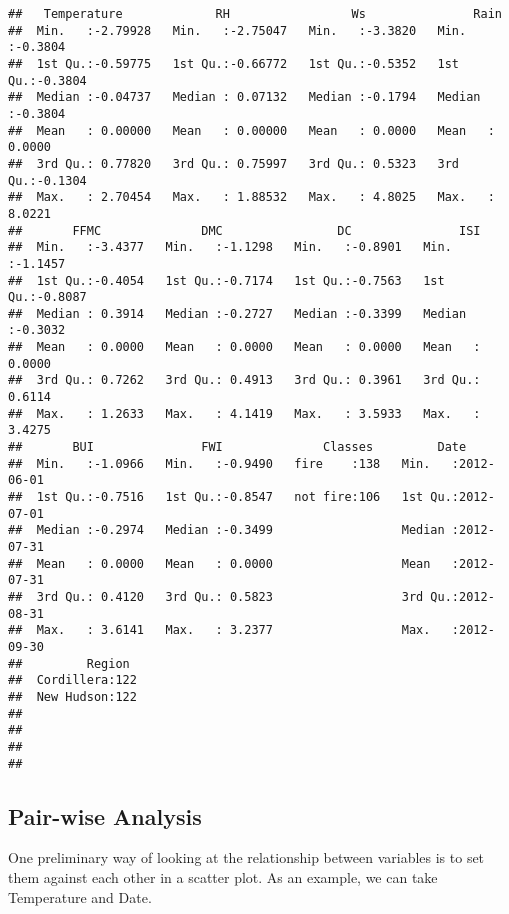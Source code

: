 \documentclass[
]{article}
\begin{document}
\begin{verbatim}
##   Temperature             RH                 Ws               Rain        
##  Min.   :-2.79928   Min.   :-2.75047   Min.   :-3.3820   Min.   :-0.3804  
##  1st Qu.:-0.59775   1st Qu.:-0.66772   1st Qu.:-0.5352   1st Qu.:-0.3804  
##  Median :-0.04737   Median : 0.07132   Median :-0.1794   Median :-0.3804  
##  Mean   : 0.00000   Mean   : 0.00000   Mean   : 0.0000   Mean   : 0.0000  
##  3rd Qu.: 0.77820   3rd Qu.: 0.75997   3rd Qu.: 0.5323   3rd Qu.:-0.1304  
##  Max.   : 2.70454   Max.   : 1.88532   Max.   : 4.8025   Max.   : 8.0221  
##       FFMC              DMC                DC               ISI         
##  Min.   :-3.4377   Min.   :-1.1298   Min.   :-0.8901   Min.   :-1.1457  
##  1st Qu.:-0.4054   1st Qu.:-0.7174   1st Qu.:-0.7563   1st Qu.:-0.8087  
##  Median : 0.3914   Median :-0.2727   Median :-0.3399   Median :-0.3032  
##  Mean   : 0.0000   Mean   : 0.0000   Mean   : 0.0000   Mean   : 0.0000  
##  3rd Qu.: 0.7262   3rd Qu.: 0.4913   3rd Qu.: 0.3961   3rd Qu.: 0.6114  
##  Max.   : 1.2633   Max.   : 4.1419   Max.   : 3.5933   Max.   : 3.4275  
##       BUI               FWI              Classes         Date           
##  Min.   :-1.0966   Min.   :-0.9490   fire    :138   Min.   :2012-06-01  
##  1st Qu.:-0.7516   1st Qu.:-0.8547   not fire:106   1st Qu.:2012-07-01  
##  Median :-0.2974   Median :-0.3499                  Median :2012-07-31  
##  Mean   : 0.0000   Mean   : 0.0000                  Mean   :2012-07-31  
##  3rd Qu.: 0.4120   3rd Qu.: 0.5823                  3rd Qu.:2012-08-31  
##  Max.   : 3.6141   Max.   : 3.2377                  Max.   :2012-09-30  
##         Region   
##  Cordillera:122  
##  New Hudson:122  
##                  
##                  
##                  
## 
\end{verbatim}

\subsection{Pair-wise Analysis}\label{pair-wise-analysis}

One preliminary way of looking at the relationship between variables is
to set them against each other in a scatter plot. As an example, we can
take Temperature and Date.
\end{document}
